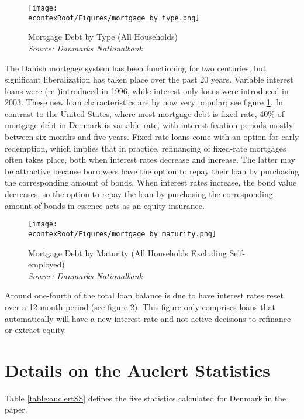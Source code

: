 \documentclass[titlepage]{\econtex}\newcommand{\texname}{ConsumptionHeterogeneity}
\begin{document}
	\begin{figure} 
		\begin{centering}
			\texttt{[image: \\econtexRoot/Figures/mortgage\_by\_type.png]} 
			\caption{Mortgage Debt by Type (All Households)
				{\\ \emph{\footnotesize
						{Source: Danmarks Nationalbank}}
			}}
			\label{fig:mortgage_by_type}
		\end{centering}
	\end{figure}
	
	The Danish mortgage system has been functioning for two centuries, but significant liberalization has taken place over the past 20 years. Variable interest loans were (re-)introduced in 1996, while interest only loans were introduced in 2003. These new loan characteristics are by now very popular; see figure \ref{fig:mortgage_by_type}. In contrast to the United States, where most mortgage debt is fixed rate, 40\% of mortgage debt in Denmark is variable rate, with interest fixation periods mostly between six months and five years. Fixed-rate loans come with an option for early redemption, which implies that in practice, refinancing of fixed-rate mortgages often takes place, both when interest rates decrease and increase. The latter may be attractive because borrowers have the option to repay their loan by purchasing the corresponding amount of bonds. When interest rates increase, the bond value decreases, so the option to repay the loan by purchasing the corresponding amount of bonds in essence acts as an equity insurance.  
	
	\begin{figure} 
		\begin{centering}
			\texttt{[image: \\econtexRoot/Figures/mortgage\_by\_maturity.png]} 
			\caption{Mortgage Debt by Maturity (All Households Excluding Self-employed)
				{\\ \emph{\footnotesize
						{Source: Danmarks Nationalbank}}
			}}
			\label{fig:mortgage_by_maturity}
		\end{centering}
	\end{figure}
	
	Around one-fourth of the total loan balance is due to have interest rates reset over a 12-month period (see figure \ref{fig:mortgage_by_maturity}). This figure only comprises loans that automatically will have a new interest rate and not active decisions to refinance or extract equity. 
	
	\section{Details on the Auclert Statistics}
	\setcounter{figure}{0}   
	\setcounter{table}{0} 
	\label{auclert_appendix}
	Table \ref{table:auclertSS} defines the five statistics calculated for Denmark in the paper.
		
\end{document}
